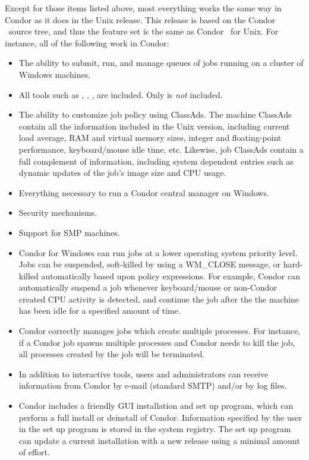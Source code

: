 Except for those items listed above, most everything works
the same way in Condor as it does in the Unix release.
This release is based on the Condor \VersionNotice\ source tree, and thus the
feature set is the same as Condor \VersionNotice\ for Unix.  
For instance, all of the following work in Condor:
\begin{itemize}

\item The ability to submit, run, and manage queues of jobs running on a
cluster of Windows machines.

\item All tools such as , , ,
are included. Only  is
\emph{not} included.

\item The ability to customize job policy using ClassAds.
The machine ClassAds contain all the information included in the Unix version,
including current load average, RAM and virtual memory sizes, integer and
floating-point performance, keyboard/mouse idle time, etc.  Likewise, job
ClassAds contain a full complement of information, including system
dependent entries such as dynamic updates of the job's image size and CPU
usage.

\item Everything necessary to run a Condor central manager on Windows.

\item Security mechanisms.

\item Support for SMP machines.

\item Condor for Windows can run jobs at a lower operating system
priority level.
Jobs can be suspended, soft-killed by using a WM\_CLOSE message,
or hard-killed automatically based upon policy expressions.
For example, Condor can automatically suspend a job
whenever keyboard/mouse or non-Condor created CPU activity is detected, and
continue the job after the the machine has been idle for a specified amount
of time.

\item Condor correctly manages jobs which create multiple processes.  For
instance, if a Condor job spawns multiple processes and Condor
needs to kill the job,
all processes created by the job will be terminated.

\item In addition to interactive tools, users and administrators can receive
information from Condor by e-mail (standard SMTP) and/or by log files.

\item Condor includes a friendly GUI installation and set up program,
which can perform a full install or deinstall of Condor.
Information specified by the user in the set up program is stored in the
system registry.  
The set up program can update a current installation with a
new release using a minimal amount of effort.

\end{itemize}

